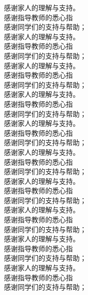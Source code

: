 \documentclass{document}
\begin{document}
\begin{cquacknowledgements}
                     感谢家人的理解与支持。\\
                     感谢指导教师的悉心指\\
                     感谢同学们的支持与帮助；\\
                      感谢家人的理解与支持。\\
                      感谢指导教师的悉心指\\
                      感谢同学们的支持与帮助；\\
                       感谢家人的理解与支持。\\
                       感谢指导教师的悉心指\\
                       感谢同学们的支持与帮助；\\
                        感谢家人的理解与支持。\\
                        感谢指导教师的悉心指\\
                        感谢同学们的支持与帮助；\\
                         感谢家人的理解与支持。\\
                         感谢指导教师的悉心指\\
                         感谢同学们的支持与帮助；\\
                          感谢家人的理解与支持。\\
                          感谢指导教师的悉心指\\
                          感谢同学们的支持与帮助；\\
                           感谢家人的理解与支持。\\
                           感谢指导教师的悉心指\\
                           感谢同学们的支持与帮助；\\
                            感谢家人的理解与支持。\\
                            感谢指导教师的悉心指\\
                            感谢同学们的支持与帮助；\\
                             感谢家人的理解与支持。\\
                             感谢指导教师的悉心指\\
                             感谢同学们的支持与帮助；\\
                              感谢家人的理解与支持。\\
                              感谢指导教师的悉心指\\
                              感谢同学们的支持与帮助；\\

\end{cquacknowledgements}

\cqustatement
\end{document}
